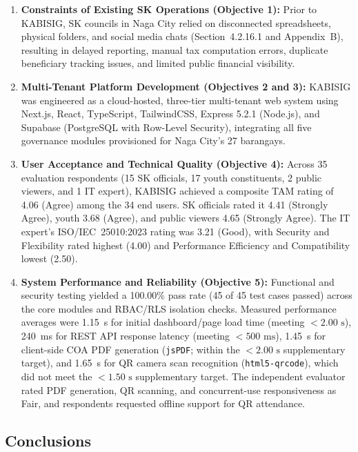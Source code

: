 \begin{enumerate}
    \item \textbf{Constraints of Existing SK Operations (Objective 1):} Prior to KABISIG, SK councils in Naga City relied on disconnected spreadsheets, physical folders, and social media chats (Section~4.2.16.1 and Appendix~B), resulting in delayed reporting, manual tax computation errors, duplicate beneficiary tracking issues, and limited public financial visibility.
    \item \textbf{Multi-Tenant Platform Development (Objectives 2 and 3):} KABISIG was engineered as a cloud-hosted, three-tier multi-tenant web system using Next.js, React, TypeScript, TailwindCSS, Express 5.2.1 (Node.js), and Supabase (PostgreSQL with Row-Level Security), integrating all five governance modules provisioned for Naga City's 27 barangays.
    \item \textbf{User Acceptance and Technical Quality (Objective 4):} Across 35 evaluation respondents (15 SK officials, 17 youth constituents, 2 public viewers, and 1 IT expert), KABISIG achieved a composite TAM rating of 4.06 (Agree) among the 34 end users. SK officials rated it 4.41 (Strongly Agree), youth 3.68 (Agree), and public viewers 4.65 (Strongly Agree). The IT expert's ISO/IEC~25010:2023 rating was 3.21 (Good), with Security and Flexibility rated highest (4.00) and Performance Efficiency and Compatibility lowest (2.50).
    \item \textbf{System Performance and Reliability (Objective 5):} Functional and security testing yielded a 100.00\% pass rate (45 of 45 test cases passed) across the core modules and RBAC/RLS isolation checks. Measured performance averages were 1.15~s for initial dashboard/page load time (meeting $< 2.00\text{ s}$), 240~ms for REST API response latency (meeting $< 500\text{ ms}$), 1.45~s for client-side COA PDF generation (\texttt{jsPDF}; within the $< 2.00\text{ s}$ supplementary target), and 1.65~s for QR camera scan recognition (\texttt{html5-qrcode}), which did not meet the $< 1.50\text{ s}$ supplementary target. The independent evaluator rated PDF generation, QR scanning, and concurrent-use responsiveness as Fair, and respondents requested offline support for QR attendance.
\end{enumerate}
\vspace{5mm}

\subsection{Conclusions}
\label{subsec:conclusions}

